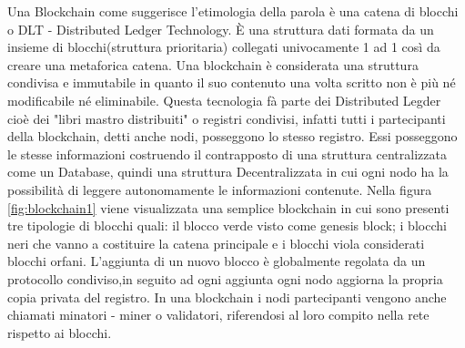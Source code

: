 \documentclass[11pt,a4paper,titlepage]{report}
\begin{document}
Una Blockchain come suggerisce l'etimologia della parola è una catena di blocchi o DLT - Distributed Ledger Technology. È una struttura dati formata da un insieme di blocchi(struttura prioritaria) collegati univocamente 1 ad 1 così da creare una metaforica catena. Una blockchain è considerata una struttura condivisa e immutabile in quanto il suo contenuto una volta scritto non è più né modificabile né eliminabile. Questa tecnologia fà parte dei Distributed Legder cioè dei "libri mastro distribuiti" o registri condivisi, infatti tutti i partecipanti della blockchain, detti anche nodi, posseggono lo stesso registro. Essi posseggono le stesse informazioni costruendo il contrapposto di una struttura centralizzata come un Database, quindi una struttura Decentralizzata in cui ogni nodo ha la possibilità di leggere autonomamente le informazioni contenute.
Nella figura \ref{fig:blockchain1} viene visualizzata una semplice blockchain in cui sono presenti tre tipologie di blocchi quali: il blocco verde visto come genesis block; i blocchi neri che vanno a costituire la catena principale e i blocchi viola considerati blocchi orfani. L'aggiunta di un nuovo blocco è globalmente regolata da un protocollo condiviso,in seguito ad ogni aggiunta ogni nodo aggiorna la propria copia privata del registro. In una blockchain i nodi partecipanti vengono anche chiamati minatori - miner o validatori, riferendosi al loro compito nella rete rispetto ai blocchi.
\end{document}
